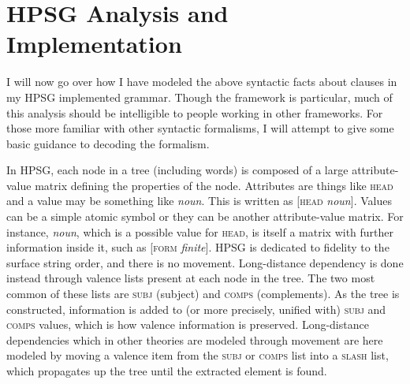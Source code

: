 


\section{HPSG Analysis and Implementation} \label{sec:clause:analysis}

I will now go over how I have modeled the above syntactic facts about clauses in my HPSG implemented grammar. Though the framework is particular, much of this analysis should be intelligible to people working in other frameworks. For those more familiar with other syntactic formalisms, I will attempt to give some basic guidance to decoding the formalism.

In HPSG, each node in a tree (including words) is composed of a large attribute-value matrix defining the properties of the node. Attributes are things like \textsc{head} and a value may be something like \textit{noun}. This is written as [\textsc{head} \textit{noun}]. Values can be a simple atomic symbol or they can be another attribute-value matrix. For instance, \textit{noun}, which is a possible value for \textsc{head}, is itself a matrix with further information inside it, such as [\textsc{form} \textit{finite}]. HPSG is dedicated to fidelity to the surface string order, and there is no movement. Long-distance dependency is done instead through valence lists present at each node in the tree. The two most common of these lists are \textsc{subj} (subject) and \textsc{comps} (complements). As the tree is constructed, information is added to (or more precisely, unified with) \textsc{subj} and \textsc{comps} values, which is how valence information is preserved. Long-distance dependencies which in other theories are modeled through movement are here modeled by moving a valence item from the \textsc{subj} or \textsc{comps} list into a \textsc{slash} list, which propagates up the tree until the extracted element is found.

